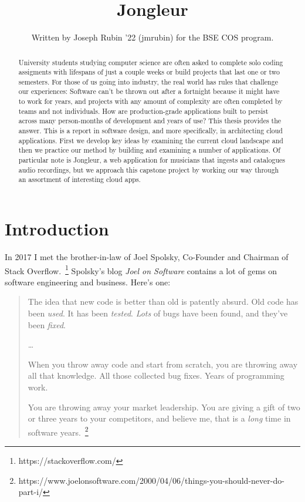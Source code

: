 \documentclass{article}
\begin{document}
\title{Jongleur}

\author{Written by Joseph Rubin '22 (jmrubin) for the BSE COS program.}

\date{}
\maketitle

\thispagestyle{empty}


\begin{abstract}
    University students studying computer science are often asked to complete solo coding assigments with lifespans of just a couple weeks or build projects that last one or two semesters.
    For those of us going into industry, the real world has rules that challenge our experiences:
    Software can't be thrown out after a fortnight because it might have to work for years, and projects with any amount of complexity are often completed by teams and not individuals.
    How are production-grade applications built to persist across many person-months of development and years of use?
    This thesis provides the answer.
    This is a report in software design, and more specifically, in architecting cloud applications.
    First we develop key ideas by examining the current cloud landscape and then we practice our method by building and examining a number of applications.
    Of particular note is Jongleur, a web application for musicians that ingests and catalogues audio recordings, but we approach this capstone project by working our way through an assortment of interesting cloud apps.
\end{abstract}

\newpage

\section{Introduction}

In 2017 I met the brother-in-law of Joel Spolsky, Co-Founder and Chairman of Stack Overflow.~\footnote{https://stackoverflow.com/}
Spolsky's blog \textit{Joel on Software} contains a lot of gems on software engineering and business.
Here's one:

\begin{quote}
  The idea that new code is better than old is patently absurd.
  Old code has been \textit{used}.
  It has been \textit{tested}.
  \textit{Lots} of bugs have been found, and they’ve been \textit{fixed}.

  \ldots

  When you throw away code and start from scratch, you are throwing away all that knowledge.
  All those collected bug fixes.
  Years of programming work.

  You are throwing away your market leadership.
  You are giving a gift of two or three years to your competitors, and believe me, that is a \textit{long} time in software years.~\footnote{https://www.joelonsoftware.com/2000/04/06/things-you-should-never-do-part-i/}
\end{quote}
\end{document}
